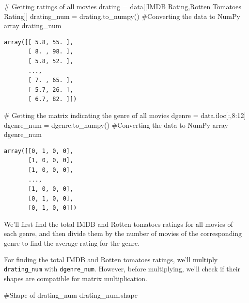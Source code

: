 \documentclass[
  letterpaper,
  DIV=11,
  numbers=noendperiod]{scrreprt}
\newenvironment{Shaded}{\begin{snugshade}}{\end{snugshade}}
\newcommand{\CommentTok}[1]{\textcolor[rgb]{0.37,0.37,0.37}{#1}}
\newcommand{\DecValTok}[1]{\textcolor[rgb]{0.68,0.00,0.00}{#1}}
\newcommand{\NormalTok}[1]{\textcolor[rgb]{0.00,0.23,0.31}{#1}}
\newcommand{\OperatorTok}[1]{\textcolor[rgb]{0.37,0.37,0.37}{#1}}
\newcommand{\StringTok}[1]{\textcolor[rgb]{0.13,0.47,0.30}{#1}}
\begin{document}
\begin{Shaded}
\begin{Highlighting}[]
\CommentTok{\# Getting ratings of all movies}
\NormalTok{drating }\OperatorTok{=}\NormalTok{ data[[}\StringTok{\textquotesingle{}IMDB Rating\textquotesingle{}}\NormalTok{,}\StringTok{\textquotesingle{}Rotten Tomatoes Rating\textquotesingle{}}\NormalTok{]]}
\NormalTok{drating\_num }\OperatorTok{=}\NormalTok{ drating.to\_numpy() }\CommentTok{\#Converting the data to NumPy array}
\NormalTok{drating\_num}
\end{Highlighting}
\end{Shaded}

\begin{verbatim}
array([[ 5.8, 55. ],
       [ 8. , 98. ],
       [ 5.8, 52. ],
       ...,
       [ 7. , 65. ],
       [ 5.7, 26. ],
       [ 6.7, 82. ]])
\end{verbatim}

\begin{Shaded}
\begin{Highlighting}[]
\CommentTok{\# Getting the matrix indicating the genre of all movies}
\NormalTok{dgenre }\OperatorTok{=}\NormalTok{ data.iloc[:,}\DecValTok{8}\NormalTok{:}\DecValTok{12}\NormalTok{]}
\NormalTok{dgenre\_num }\OperatorTok{=}\NormalTok{ dgenre.to\_numpy() }\CommentTok{\#Converting the data to NumPy array}
\NormalTok{dgenre\_num}
\end{Highlighting}
\end{Shaded}

\begin{verbatim}
array([[0, 1, 0, 0],
       [1, 0, 0, 0],
       [1, 0, 0, 0],
       ...,
       [1, 0, 0, 0],
       [0, 1, 0, 0],
       [0, 1, 0, 0]])
\end{verbatim}

We'll first find the total IMDB and Rotten tomatoes ratings for all
movies of each genre, and then divide them by the number of movies of
the corresponding genre to find the average rating for the genre.

For finding the total IMDB and Rotten tomatoes ratings, we'll multiply
\texttt{drating\_num} with \texttt{dgenre\_num}. However, before
multiplying, we'll check if their shapes are compatible for matrix
multiplication.

\begin{Shaded}
\begin{Highlighting}[]
\CommentTok{\#Shape of drating\_num}
\NormalTok{drating\_num.shape}
\end{Highlighting}
\end{Shaded}
\end{document}
